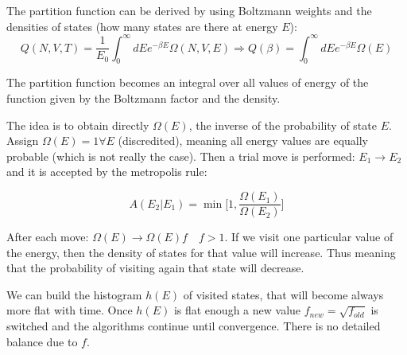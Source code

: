 	The partition function can be derived by using Boltzmann weights and the densities of states (how many states are there at energy $E$): 
	$$Q(N, V, T) = \frac{1}{E_0}\int_0^{\infty}dEe^{-\beta E}\Omega(N, V, E)\Rightarrow Q(\beta) = \int_0^{\infty}dEe^{-\beta E}\Omega(E)$$
	
	The partition function becomes an integral over all values of energy of the function given by the Boltzmann factor and the density.
	
	The idea is to obtain directly $\Omega(E)$, the inverse of the probability of state $E$.
	Assign $\Omega(E)=1\forall E$ (discredited), meaning all energy values are equally probable (which is not really the case).
	Then a trial move is performed: $E_1\rightarrow E_2$ and it is accepted by the metropolis rule:

	$$A(E_2|E_1) = \min\biggl[1, \frac{\Omega(E_1)}{\Omega(E_2)}\biggr]$$

	After each move: $\Omega(E)\rightarrow \Omega(E)f\quad f>1$.
	If we visit one particular value of the energy, then the density of states for that value will increase.
	Thus meaning that the probability of visiting again that state will decrease.
	
	We can build the histogram $h(E)$ of visited states, that will become always more flat with time.
	Once $h(E)$ is flat enough a new value $f_{new} = \sqrt{f_{old}}$ is switched and the algorithms continue until convergence.
	There is no detailed balance due to $f$.
	
	
	
	
	
	
	
	
	
	
	
	
	
	
	
